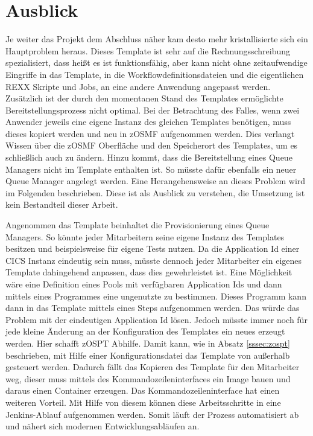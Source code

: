 \chapter{Ausblick}\label{ch:ausblick}
Je weiter das Projekt dem Abschluss näher kam desto mehr kristallisierte sich ein Hauptproblem heraus.
Dieses Template ist sehr auf die Rechnungsschreibung spezialisiert, dass heißt es ist funktionsfähig, aber kann nicht ohne zeitaufwendige Eingriffe in das Template, in die Workflowdefinitionsdateien und die eigentlichen REXX Skripte und Jobs, an eine andere Anwendung angepasst werden.
Zusätzlich ist der durch den momentanen Stand des Templates ermöglichte Bereitstellungsprozess nicht optimal.
Bei der Betrachtung des Falles, wenn zwei Anwender jeweils eine eigene Instanz des gleichen Templates benötigen, muss dieses kopiert werden und neu in zOSMF aufgenommen werden.
Dies verlangt Wissen über die zOSMF Oberfläche und den Speicherort des Templates, um es schließlich auch zu ändern.
Hinzu kommt, dass die Bereitstellung eines Queue Managers nicht im Template enthalten ist.
So müsste dafür ebenfalls ein neuer Queue Manager angelegt werden.
Eine Herangehensweise an dieses Problem wird im Folgenden beschrieben.
Diese ist als Ausblick zu verstehen, die Umsetzung ist kein Bestandteil dieser Arbeit.

Angenommen das Template beinhaltet die Provisionierung eines Queue Managers.
So könnte jeder Mitarbeitern seine eigene Instanz des Templates besitzen und beispielsweise für eigene Tests nutzen.
Da die Application Id einer CICS Instanz eindeutig sein muss, müsste dennoch jeder Mitarbeiter ein eigenes Template dahingehend anpassen, dass dies gewehrleistet ist.
Eine Möglichkeit wäre eine Definition eines Pools mit verfügbaren Application Ids und dann mittels eines Programmes eine ungenutzte zu bestimmen.
Dieses Programm kann dann in das Template mittels eines Steps aufgenommen werden.
Das würde das Problem mit der eindeutigen Application Id lösen.
Jedoch müsste immer noch für jede kleine Änderung an der Konfiguration des Templates ein neues erzeugt werden.
Hier schafft zOSPT Abhilfe.
Damit kann, wie in Absatz \ref{sssec:zospt} beschrieben, mit Hilfe einer Konfigurationsdatei das Template von außerhalb gesteuert werden.
Dadurch fällt das Kopieren des Template für den Mitarbeiter weg, dieser muss mittels des Kommandozeileninterfaces ein Image bauen und daraus einen Container erzeugen.
Das Kommandozeileninterface hat einen weiteren Vorteil.
Mit Hilfe von diesem können diese Arbeitsschritte in eine Jenkins-Ablauf aufgenommen werden.
Somit läuft der Prozess automatisiert ab und nähert sich modernen Entwicklungsabläufen an.

